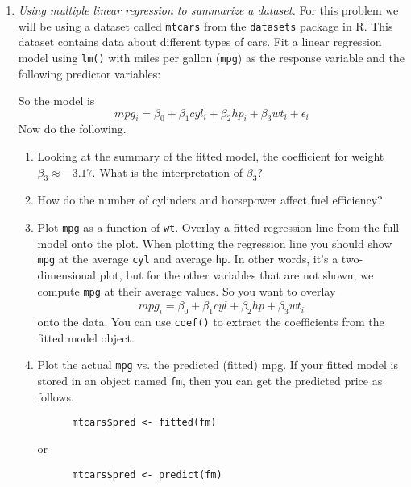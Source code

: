 \begin{enumerate}
\item \emph{Using multiple linear regression to summarize a dataset.}
  For this problem we will be using a dataset called \texttt{mtcars}
  from the \texttt{datasets} package in R. This dataset contains data
  about different types of cars.  Fit a linear regression model using
  \texttt{lm()} with miles per gallon (\texttt{mpg}) as the response
  variable and the following predictor variables:
    So the model is
    \[ mpg_i = \beta_0 + \beta_1 cyl_i + \beta_2 hp_i +
      \beta_3 wt_i + \epsilon_i \]
    Now do the following.
    \begin{enumerate}
    \item Looking at the summary of the fitted model, the coefficient for weight 
      $\beta_3 \approx -3.17$. What is the interpretation of $\beta_3$?
      
    \item How do the number of cylinders and horsepower affect fuel
      efficiency?
     
    \item Plot \texttt{mpg} as a function of
    \texttt{wt}. Overlay a fitted regression line from the
    full model onto the plot.  When plotting the regression line you
    should show \texttt{mpg} at the average \texttt{cyl} and average \texttt{hp}.
    In other words, it's a two-dimensional plot, but for the other
    variables that are not shown, we compute \texttt{mpg} at their
    average values. So you want to overlay
    \[ mpg_i = \beta_0 + \beta_1 \overline{cyl} +
      \beta_2 \overline{hp} +
      \beta_3 wt_i \]
    onto the data. You can use \texttt{coef()} to extract the
    coefficients from the fitted model object.

  \item Plot the actual \texttt{mpg} vs. the predicted (fitted)
    mpg. If your fitted model is stored in an object named
    \texttt{fm}, then you can get the predicted price as follows.
    \begin{Verbatim}
      mtcars$pred <- fitted(fm)
    \end{Verbatim}
    or
    \begin{Verbatim}
      mtcars$pred <- predict(fm)
    \end{Verbatim}


\end{enumerate}
\end{enumerate}
